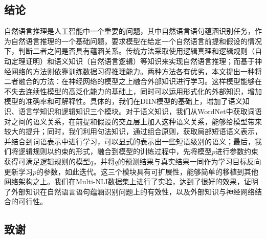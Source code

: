 \documentclass[UTF8,11pt,a4paper,nofonts]{ctexart}
\numberwithin{equation}{section}
\begin{document}






\newpage
\begin{center}
\section{结论}
\end{center}
\par

自然语言推理是人工智能中一个重要的问题，其中自然语言语句蕴涵识别任务，作为自然语言推理的一个基础问题，要求模型在给定一个自然语言前提和假设的情况下，判断二者之间是否具有蕴涵关系。传统方法采取使用逻辑真理和逻辑规则（自动定理证明）和语义知识（自然语言逻辑）等知识来实现自然语言推理；而基于神经网络的方法则依靠训练数据习得推理能力。两种方法各有优劣，本文提出一种将二者融合的方法：在神经网络的模型之上融合外部知识进行学习。这样模型能够在不失去连续性模型的高泛化能力的基础上，同时可以运用形式化的外部知识，增加模型的准确率和可解释性。具体的，我们在DIIN模型的基础上，增加了语义知识、语言学知识和逻辑知识三个模块。对于语义知识，我们从WordNet中获取词语对之间的语义关系，在前提和假设的交互层上加入这种语义关系，能够给模型带来较大的提升；同时，我们利用句法知识，通过组合原则，获取局部短语语义表示，并结合到词语表示中进行学习，可以显式的表示出一些短语级别的语义；最后，我们将逻辑规则以约束的形式，融合到模型的训练过程中，先将模型$p$进行参数约束获得可满足逻辑规则的模型$q$，并将$q$的预测结果与真实结果一同作为学习目标反向更新学习$p$的参数，如此迭代。这三个模块具有可扩展性，能够简单的移植到其他网络架构之上。我们在Multi-NLI数据集上进行了实验，达到了很好的效果，证明了外部知识在自然语言语句蕴涵识别问题上的有效性，以及外部知识与神经网络结合的可行性。


\newpage
{}


\newpage
{}
\begin{center}
\section*{致谢}
\end{center}
\par
\end{document}
